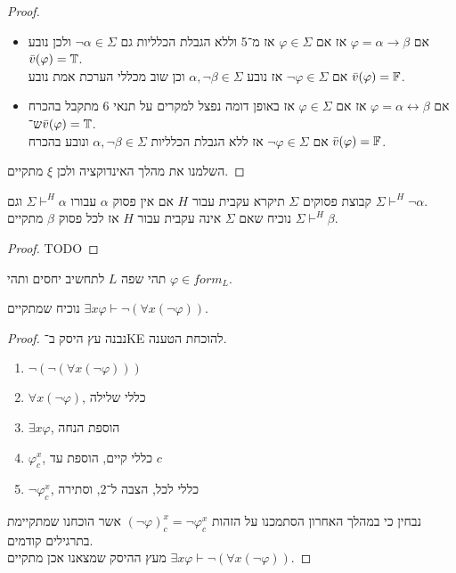 \begin{proof}
\begin{itemize}
		\item אם $\varphi = \alpha \to \beta$ אז אם $\varphi \in \Sigma$ אז מ־5 וללא הגבלת הכלליות גם $\lnot \alpha \in \Sigma$ ולכן נובע $\bar{v}(\varphi) = \mathbb{T}$. \\
			אם $\lnot \varphi \in \Sigma$ אז נובע $\alpha, \lnot \beta \in \Sigma$ וכן שוב מכללי הערכת אמת נובע $\bar{v}(\varphi) = \mathbb{F}$.
		\item אם $\varphi = \alpha \leftrightarrow \beta$ אז אם $\varphi \in \Sigma$ אז באופן דומה נפצל למקרים על תנאי 6 מתקבל בהכרח ש־$\bar{v}(\varphi) = \mathbb{T}$. \\
			אם $\lnot \varphi \in \Sigma$ אז ללא הגבלת הכלליות $\alpha, \lnot \beta \in \Sigma$ ונובע בהכרח $\bar{v}(\varphi) = \mathbb{F}$.
	\end{itemize}
	השלמנו את מהלך האינדוקציה ולכן $\xi$ מתקיים.
\end{proof}

\question{}
\subquestion[2]
קבוצת פסוקים $\Sigma$ תיקרא עקבית עבור $H$ אם אין פסוק $\alpha$ עבורו $\Sigma \vdash^H \alpha$ וגם $\Sigma \vdash^H \lnot \alpha$. \\
נוכיח שאם $\Sigma$ אינה עקבית עבור $H$ אז לכל פסוק $\beta$ מתקיים $\Sigma \vdash^H \beta$.
\begin{proof}
	TODO
\end{proof}

\question{}
תהי שפה $L$ לתחשיב יחסים ותהי $\varphi \in form_L$.

\subquestion{}
נוכיח שמתקיים $\exists x \varphi \vdash \lnot (\forall x (\lnot \varphi))$.
\begin{proof}
	נבנה עץ היסק ב־KE להוכחת הטענה.
	\begin{enumerate}
		\item $\lnot (\lnot (\forall x (\lnot \varphi)))$
		\item $\forall x (\lnot \varphi)$, כללי שלילה
		\item $\exists x \varphi$, הוספת הנחה
		\item $\varphi^x_c$, כללי קיים, הוספת עד $c$
		\item $\lnot \varphi^x_c$, כללי לכל, הצבה ל־2, וסתירה
	\end{enumerate}
	נבחין כי במהלך האחרון הסתמכנו על הזהות ${(\lnot \varphi)}^x_c = \lnot \varphi^x_c$ אשר הוכחנו שמתקיימת בתרגילים קודמים. \\
	מעץ ההיסק שמצאנו אכן מתקיים $\exists x \varphi \vdash \lnot (\forall x (\lnot \varphi))$.
\end{proof}

